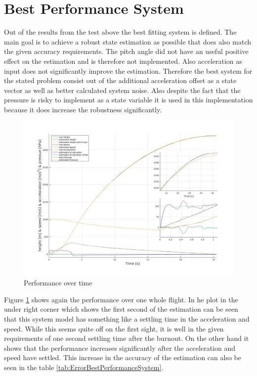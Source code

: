 \section{Best Performance System}
Out of the results from the test above the best fitting system is defined.
The main goal is to achieve a robust state estimation as possible that does also match the given accuracy requirements.
The pitch angle did not have an useful positive effect on the estimation and is therefore not implemented.
Also acceleration as input does not significantly improve the estimation.
Therefore the best system for the stated problem consist out of the additional acceleration offset as a state vector as well as better calculated system noise.
Also despite the fact that the pressure is risky to implement as a state variable it is used in this implementation because it does increase the robustness significantly.

\begin{figure}[h!]
 \centering
 \includegraphics[width=.8\textwidth]{./Pictures/BestSystemPerformance.jpg}
 \caption{Performance over time}
 \label{fig:BestSystemPerformance}
\end{figure}

Figure \ref{fig:BestSystemPerformance} shows again the performance over one whole flight.
In he plot in the under right corner which shows the first second of the estimation can be seen that this system model has something like a settling time in the acceleration and speed.
While this seems quite off on the first sight, it is well in the given requirements of one second settling time after the burnout.
On the other hand it shows that the performance increases significantly after the acceleration and speed have settled.
This increase in the accuracy of the estimation can also be seen in the table \ref{tab:ErrorBestPerformanceSystem}.

